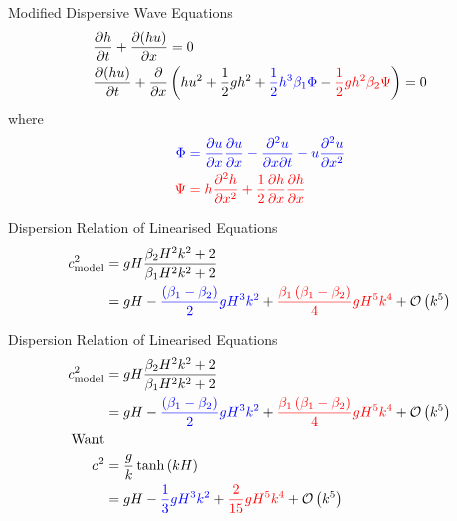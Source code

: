 \documentclass[pdf]{beamer}
\begin{document}
\begin{frame}{Modified Dispersive Wave Equations}
\begin{align*}
&\dfrac{\partial h}{\partial t} + \dfrac{\partial (hu)}{\partial x} = 0\\
&\dfrac{\partial (hu)}{\partial t} + \dfrac{\partial }{\partial x} \left( hu^2 + \frac{1}{2}gh^2  +  {\color{blue} \frac{1}{2}h^3\beta_1 \Phi } -   {\color{red} \frac{1}{2}gh^2 \beta_2 \Psi}  \right)= 0 \\
\end{align*}
where
\begin{align*}
\color{blue} \Phi  & \color{blue}= \frac{\partial u}{\partial x}\frac{\partial u}{\partial x} - \frac{\partial^2 u}{\partial x \partial t} - u\frac{\partial^2 u}{\partial x^2} \\
\color{red} \Psi & \color{red}= h \frac{\partial^2 h}{\partial x^2} + \frac{1}{2} \frac{\partial h}{\partial x}\frac{\partial h}{\partial x} 
\end{align*}
\end{frame}

\begin{frame}{Dispersion Relation of Linearised Equations}
\begin{align*}
c_{\text{model}}^2 & = gH \dfrac{\beta_2 H^2 k^2 + 2}{ \beta_1H^2 k^2 + 2}
\\& = gH - {\color{blue} \frac{\left(\beta_1 - \beta_2\right)}{2}gH^3 k^2} + {\color{red}\frac{\beta_1\left(\beta_1 - \beta_2\right)}{4} g H^5 k^4}  + \mathcal{O}\left(k^5\right)
\end{align*}
\end{frame}

\begin{frame}{Dispersion Relation of Linearised Equations}
\begin{align*}
c_{\text{model}}^2 & = gH \dfrac{\beta_2 H^2 k^2 + 2}{ \beta_1H^2 k^2 + 2}
\\& = gH - {\color{blue} \frac{\left(\beta_1 - \beta_2\right)}{2}gH^3 k^2} + {\color{red}\frac{\beta_1\left(\beta_1 - \beta_2\right)}{4} g H^5 k^4}  + \mathcal{O}\left(k^5\right) \\
\text{Want} \\c^2  &= \frac{g}{k} \tanh\left(kH\right) \\
 &= gH - {\color{blue}\frac{1}{3}g H^3 k^2} + {\color{red}\frac{2}{15} g H^5 k^4} + \mathcal{O}\left(k^5\right)
\end{align*}
\end{frame}
\end{document}
